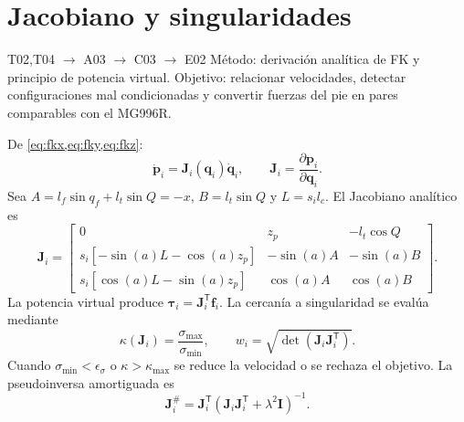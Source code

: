 \documentclass[11pt,letterpaper]{article}
\newcommand{\vect}[1]{\bm{#1}}
\newcommand{\mat}[1]{\bm{#1}}
\newcommand{\trans}{^{\mathsf T}}
\begin{document}
\section{Jacobiano y singularidades}
\begin{tracebox}{T02,T04 $\rightarrow$ A03 $\rightarrow$ C03 $\rightarrow$ E02}
Método: derivación analítica de FK y principio de potencia virtual. Objetivo:
relacionar velocidades, detectar configuraciones mal condicionadas y convertir
fuerzas del pie en pares comparables con el MG996R.
\end{tracebox}
De \cref{eq:fkx,eq:fky,eq:fkz}:
\begin{equation}
 \dot{\vect p}_i=\mat J_i(\vect q_i)\dot{\vect q}_i,\qquad
 \mat J_i=\frac{\partial\vect p_i}{\partial\vect q_i}.\label{eq:jacdef}
\end{equation}
Sea $A=l_f\sin q_f+l_t\sin Q=-x$, $B=l_t\sin Q$ y $L=s_il_c$.
El Jacobiano analítico es
\begin{equation}
\mat J_i=\begin{bmatrix}
0&z_p&-l_t\cos Q\\
s_i[-\sin(a)L-\cos(a)z_p]&-\sin(a)A&-\sin(a)B\\
s_i[ \cos(a)L-\sin(a)z_p]& \cos(a)A& \cos(a)B
\end{bmatrix}.\label{eq:jacobian}
\end{equation}
La potencia virtual produce $\vect\tau_i=\mat J_i\trans\vect f_i$. La cercanía
a singularidad se evalúa mediante
\begin{equation}
 \kappa(\mat J_i)=\frac{\sigma_{\max}}{\sigma_{\min}},\qquad
 w_i=\sqrt{\det(\mat J_i\mat J_i\trans)}.\label{eq:singularity}
\end{equation}
Cuando $\sigma_{\min}<\epsilon_\sigma$ o $\kappa>\kappa_{\max}$ se reduce la
velocidad o se rechaza el objetivo. La pseudoinversa amortiguada es
\begin{equation}
\mat J_i^{\#}=\mat J_i\trans(\mat J_i\mat J_i\trans+\lambda^2\mat I)^{-1}.
\end{equation}
\end{document}
